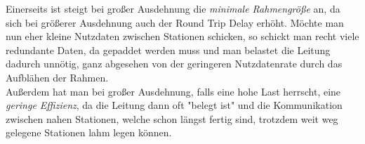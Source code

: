 \documentclass{../exercisesheet}
\begin{document}
\begin{exercise}{6}
\begin{subexercise}
\end{subexercise}
\begin{subexercise}
	Einerseits ist steigt bei großer Ausdehnung die \textit{minimale Rahmengröße} an, da sich bei größerer Ausdehnung auch der Round Trip Delay erhöht. Möchte man nun
	eher kleine Nutzdaten zwischen Stationen schicken, so schickt man recht viele redundante Daten, da gepaddet werden muss und man belastet die Leitung dadurch unnötig, ganz
	abgesehen von der geringeren Nutzdatenrate durch das Aufblähen der Rahmen.\\
	Außerdem hat man bei großer Ausdehnung, falls eine hohe Last herrscht, eine \textit{geringe Effizienz}, da die Leitung dann oft "belegt ist" und die Kommunikation zwischen
	nahen Stationen, welche schon längst fertig sind, trotzdem weit weg gelegene Stationen lahm legen können.
	
\end{subexercise}
\end{exercise}
\end{document}
